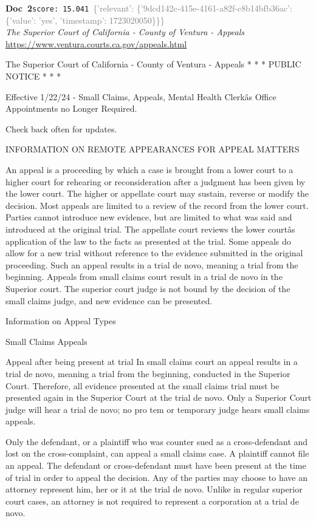 \documentclass[a4paper,11pt]{article}
\begin{document}
\begin{docenv}
{\footnotesize\textcolor{doccolor}{\textbf{Doc~2}}}\hfill{\tiny\texttt{score:~15.041}}\ {\tiny\textcolor{gray}{\{'relevant': \{'9dcd142c-415e-4161-a82f-c8b14bfb36ac': \{'value': 'yes', 'timestamp': 1723020050\}\}\}}}\\[3pt]
{\small\textit{The Superior Court of California - County of Ventura - Appeals}}\\[2pt]
{\tiny\url{https://www.ventura.courts.ca.gov/appeals.html}}\\[4pt]
{\footnotesize The Superior Court of California - County of Ventura - Appeals
* * * PUBLIC NOTICE * * *

Effective 1/22/24 - Small Claims, Appeals, Mental Health Clerkâs Office Appointments no Longer Required.

Check back often for updates.

INFORMATION ON REMOTE APPEARANCES FOR APPEAL MATTERS

An appeal is a proceeding by which a case is brought from a lower court to a higher court for rehearing or reconsideration after a judgment has been given by the lower court. 
 The higher or appellate court may sustain, reverse or modify the decision. Most appeals are limited to a review of the record from the lower court. Parties cannot introduce new 
 evidence, but are limited to what was said and introduced at the original trial. The appellate court reviews the lower courtâs application of the law to the facts as presented 
 at the trial.
Some appeals do allow for a new trial without reference to the evidence submitted in the original proceeding. Such an appeal results in a trial de novo, meaning a trial 
 from the beginning. Appeals from small claims court result in a trial de novo in the Superior court. The superior court judge is not bound by the decision of the small claims 
 judge, and new evidence can be presented.

Information on Appeal Types

Small Claims Appeals

Appeal after being present at trial
In small claims court an appeal results in a trial de novo, meaning a trial from the beginning, conducted in the Superior Court. Therefore, all evidence presented at the 
 small claims trial must be presented again in the Superior Court at the trial de novo. Only a Superior Court judge will hear a trial de novo; no pro tem or temporary judge 
 hears small claims appeals.

 Only the defendant, or a plaintiff who was counter sued as a cross-defendant and lost on the cross-complaint, can appeal a small claims case. A plaintiff cannot file an 
 appeal. The defendant or cross-defendant must have been present at the time of trial in order to appeal the decision.
Any of the parties may choose to have an attorney represent him, her or it at the trial de novo. Unlike in regular superior court cases, an attorney is not required to 
 represent a corporation at a trial de novo.}
\end{docenv}
\end{document}
